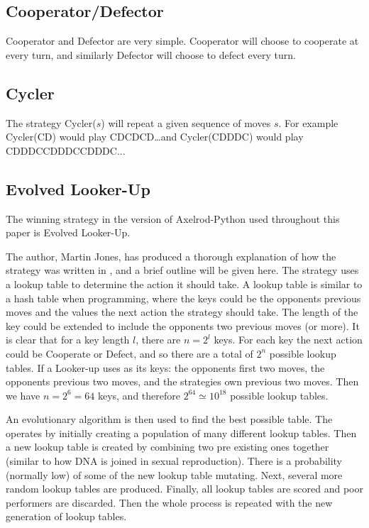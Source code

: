 \subsection{Cooperator/Defector}\label{ssec:strat_coop_defect}
Cooperator and Defector are very simple.
Cooperator will choose to cooperate at every turn, and similarly Defector will choose to defect every turn.

\subsection{Cycler}\label{ssec:strat_cycler}
The strategy Cycler($s$) will repeat a given sequence of moves $s$.
For example Cycler(CD) would play CDCDCD\dots and Cycler(CDDDC) would play CDDDCCDDDCCDDDC...

\subsection{Evolved Looker-Up}\label{ssec:strat_evolved_lu}
The winning strategy in the version of Axelrod-Python used throughout this paper is Evolved Looker-Up.

The author, Martin Jones, has produced a thorough explanation of how the strategy was written in \cite{MoJones}, and a brief outline will be given here.
The strategy uses a lookup table to determine the action it should take.
A lookup table is similar to a hash table when programming, where the keys could be the opponents previous moves and the values the next action the strategy should take.
The length of the key could be extended to include the opponents two previous moves (or more).
It is clear that for a key length $l$, there are $n = 2^l$ keys.
For each key the next action could be Cooperate or Defect, and so there are a total of $2^n$ possible lookup tables.
If a Looker-up uses as its keys: the opponents first two moves, the opponents previous two moves, and the strategies own previous two moves.
Then we have $n = 2^6 = 64$ keys, and therefore $2^{64} \simeq 10^{18}$ possible lookup tables.

An evolutionary algorithm is then used to find the best possible table.
The operates by initially creating a population of many different lookup tables.
Then a new lookup table is created by combining two pre existing ones together
(similar to how DNA is joined in sexual reproduction).
There is a probability (normally low) of some of the new lookup table mutating.
Next, several more random lookup tables are produced.
Finally, all lookup tables are scored and poor performers are discarded.
Then the whole process is repeated with the new generation of lookup tables.

